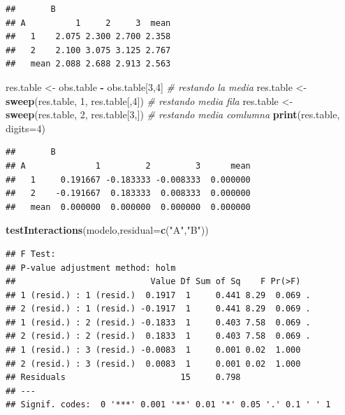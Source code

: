 \documentclass[]{book}
\newenvironment{Shaded}{\begin{snugshade}}{\end{snugshade}}
\newcommand{\KeywordTok}[1]{\textcolor[rgb]{0.13,0.29,0.53}{\textbf{#1}}}
\newcommand{\DataTypeTok}[1]{\textcolor[rgb]{0.13,0.29,0.53}{#1}}
\newcommand{\DecValTok}[1]{\textcolor[rgb]{0.00,0.00,0.81}{#1}}
\newcommand{\StringTok}[1]{\textcolor[rgb]{0.31,0.60,0.02}{#1}}
\newcommand{\CommentTok}[1]{\textcolor[rgb]{0.56,0.35,0.01}{\textit{#1}}}
\newcommand{\OperatorTok}[1]{\textcolor[rgb]{0.81,0.36,0.00}{\textbf{#1}}}
\newcommand{\NormalTok}[1]{#1}
\begin{document}
\begin{verbatim}
##       B
## A          1     2     3  mean
##   1    2.075 2.300 2.700 2.358
##   2    2.100 3.075 3.125 2.767
##   mean 2.088 2.688 2.913 2.563
\end{verbatim}

\begin{Shaded}
\begin{Highlighting}[]
\NormalTok{res.table <-}\StringTok{ }\NormalTok{obs.table }\OperatorTok{-}\StringTok{ }\NormalTok{obs.table[}\DecValTok{3}\NormalTok{,}\DecValTok{4}\NormalTok{] }\CommentTok{# restando la media}
\NormalTok{res.table <-}\StringTok{ }\KeywordTok{sweep}\NormalTok{(res.table, }\DecValTok{1}\NormalTok{, res.table[,}\DecValTok{4}\NormalTok{]) }\CommentTok{# restando media fila}
\NormalTok{res.table <-}\StringTok{ }\KeywordTok{sweep}\NormalTok{(res.table, }\DecValTok{2}\NormalTok{, res.table[}\DecValTok{3}\NormalTok{,]) }\CommentTok{# restando media comlumna}
\KeywordTok{print}\NormalTok{(res.table, }\DataTypeTok{digits=}\DecValTok{4}\NormalTok{)}
\end{Highlighting}
\end{Shaded}

\begin{verbatim}
##       B
## A              1         2         3      mean
##   1     0.191667 -0.183333 -0.008333  0.000000
##   2    -0.191667  0.183333  0.008333  0.000000
##   mean  0.000000  0.000000  0.000000  0.000000
\end{verbatim}

\begin{Shaded}
\begin{Highlighting}[]
\KeywordTok{testInteractions}\NormalTok{(modelo,}\DataTypeTok{residual=}\KeywordTok{c}\NormalTok{(}\StringTok{"A"}\NormalTok{,}\StringTok{"B"}\NormalTok{))}
\end{Highlighting}
\end{Shaded}

\begin{verbatim}
## F Test: 
## P-value adjustment method: holm
##                           Value Df Sum of Sq    F Pr(>F)  
## 1 (resid.) : 1 (resid.)  0.1917  1     0.441 8.29  0.069 .
## 2 (resid.) : 1 (resid.) -0.1917  1     0.441 8.29  0.069 .
## 1 (resid.) : 2 (resid.) -0.1833  1     0.403 7.58  0.069 .
## 2 (resid.) : 2 (resid.)  0.1833  1     0.403 7.58  0.069 .
## 1 (resid.) : 3 (resid.) -0.0083  1     0.001 0.02  1.000  
## 2 (resid.) : 3 (resid.)  0.0083  1     0.001 0.02  1.000  
## Residuals                       15     0.798              
## ---
## Signif. codes:  0 '***' 0.001 '**' 0.01 '*' 0.05 '.' 0.1 ' ' 1
\end{verbatim}
\end{document}
